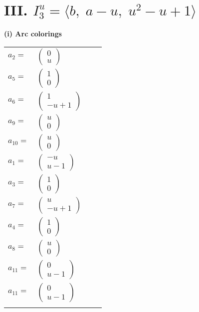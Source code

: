 \documentclass[1p]{elsarticle_modified}
\theoremstyle{definition}
\begin{document}
\centering \section*{III. $I^u_{3}= \langle b,\;a- u,\;u^2- u+1 \rangle$}
\flushleft \textbf{(i) Arc colorings}\\
\begin{tabular}{m{7pt} m{180pt} m{7pt} m{180pt} }
\flushright $a_{2}=$&$\begin{pmatrix}0\\u\end{pmatrix}$ \\
\flushright $a_{5}=$&$\begin{pmatrix}1\\0\end{pmatrix}$ \\
\flushright $a_{6}=$&$\begin{pmatrix}1\\- u+1\end{pmatrix}$ \\
\flushright $a_{9}=$&$\begin{pmatrix}u\\0\end{pmatrix}$ \\
\flushright $a_{10}=$&$\begin{pmatrix}u\\0\end{pmatrix}$ \\
\flushright $a_{1}=$&$\begin{pmatrix}- u\\u-1\end{pmatrix}$ \\
\flushright $a_{3}=$&$\begin{pmatrix}1\\0\end{pmatrix}$ \\
\flushright $a_{7}=$&$\begin{pmatrix}u\\- u+1\end{pmatrix}$ \\
\flushright $a_{4}=$&$\begin{pmatrix}1\\0\end{pmatrix}$ \\
\flushright $a_{8}=$&$\begin{pmatrix}u\\0\end{pmatrix}$ \\
\flushright $a_{11}=$&$\begin{pmatrix}0\\u-1\end{pmatrix}$\\ \flushright $a_{11}=$&$\begin{pmatrix}0\\u-1\end{pmatrix}$\\&\end{tabular}
\end{document}
